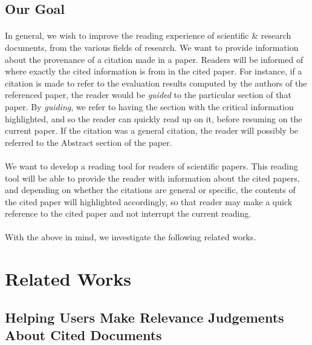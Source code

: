 \documentclass[12 pt]{article}
\begin{document}
\subsection{Our Goal}
\paragraph{}
In general, we wish to improve the reading experience of scientific \& research documents, from the various fields of research. We want to provide information about the provenance of a citation made in a paper. Readers will be informed of where exactly the cited information is from in the cited paper. For instance, if a citation is made to refer to the evaluation results computed by the authors of the referenced paper, the reader would be \textit{guided} to the particular section of that paper. By \textit{guiding}, we refer to having the section with the critical information highlighted, and so the reader can quickly read up on it, before resuming on the current paper. If the citation was a general citation, the reader will possibly be referred to the Abstract section of the paper.

\paragraph{}
We want to develop a reading tool for readers of scientific papers. This reading tool will be able to provide the reader with information about the cited papers, and depending on whether the citations are general or specific, the contents of the cited paper will highlighted accordingly, so that reader may make a quick reference to the cited paper and not interrupt the current reading.

\paragraph{}
With the above in mind, we investigate the following related works.

\section{Related Works}
\subsection{Helping Users Make Relevance Judgements About Cited Documents}
\end{document}
